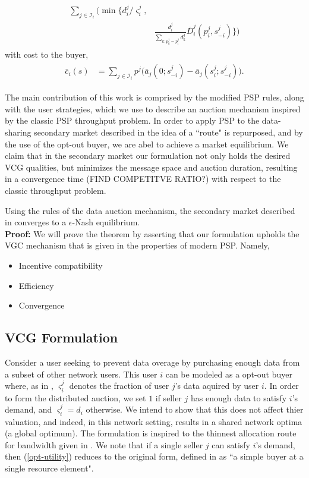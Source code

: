 \documentclass[12pt]{article}
\theoremstyle{definition}
\newcommand{\vs}{\varsigma}
\newcommand{\mcI}{\mathcal{I}}
\begin{document}
\begin{multicols}{2}
\begin{align}
\begin{split}
\displaystyle\sum_{j\in\mcI_i}\bigg(\min\bigg\lbrace d_i^j/\vs_i^j,
\\
    &\frac{d_i^j}{\sum_{k:p_k^j=
p_i^j}d_k^j}
\bar{D}_i^j(p_i^j,s_{-i}^j)\bigg\rbrace\bigg)
\end{split}
\end{align}
with cost to the buyer,
\begin{align}\label{datacost}
\begin{split}
    \bar{c}_i(s) &= \displaystyle\sum_{j\in\mcI_i} 
p^j \bigg(\bar{a}_j(0; s_{-i}^j)
    -\bar{a}_j(s_i^j;s_{-i}^j)\bigg).
\end{split}
\end{align}



The main contribution of this work is comprised by the modified PSP rules,
along with the user strategies, which we use to
describe an auction mechanism inspired by the classic PSP throughput problem. In order to apply PSP to the data-sharing secondary market described in
\cite{zheng} the idea of a ``route" is repurposed, and by the use of the
opt-out buyer, we are abel to achieve a market equilibrium. We claim that in
the secondary market our
formulation not only holds the desired VCG qualities, but minimizes the message
space and auction duration, resulting in a convergence time (FIND COMPETITVE RATIO?)
with respect to the classic throughput problem.

{
Using the rules of the data auction mechanism, the secondary market described in \cite{zheng} converges to a $\epsilon$-Nash equilibrium.
}\\
\textbf{Proof:}
We will prove the theorem by asserting that our formulation upholds the VGC
mechanism that is given in the properties of modern PSP. Namely,
\begin{itemize}
    \item Incentive compatibility
    \item Efficiency 
    \item Convergence
\end{itemize}

\subsection{VCG Formulation}
Consider a user seeking to prevent
data overage by purchasing enough data from a subset of other network users.
This user $i$ can be modeled as a opt-out buyer where, as in \cite{semret}, $\vs_i^j$ denotes the
fraction of user $j$'s data aquired by user $i$. In order to form the
distributed auction, we set $1$ if seller $j$ has enough data to
satisfy $i$'s demand, and $\vs_i^j=d_i$ otherwise. We intend to show that this
does not affect thier valuation, and indeed, in this network setting, results in a shared network optima (a
global optimum). The formulation is inspired to the thinnest allocation route for
bandwidth given in \cite{lazar}. We note that if a single seller $j$ can
satisfy $i$'s demand, then
(\ref{opt-utility}) reduces to the original form, defined in
\cite{semret} as ``a simple buyer at a single resource element".


\end{multicols}
\end{document}
